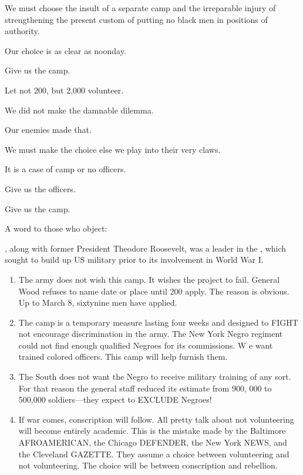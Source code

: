 \documentclass[letterpaper,10pt,english]{jupyterBook}
\begin{document}
\sphinxAtStartPar
We must choose the insult of a separate camp and the irreparable injury of strengthening the present custom of putting no black men in positions of authority.

\sphinxAtStartPar
Our choice is as clear as noonday.

\sphinxAtStartPar
Give us the camp.

\sphinxAtStartPar
Let not 200, but 2,000 volunteer.

\sphinxAtStartPar
We did not make the damnable dilemma.

\sphinxAtStartPar
Our enemies made that.

\sphinxAtStartPar
We must make the choice else we play into their very claws.

\sphinxAtStartPar
It is a case of camp or no officers.

\sphinxAtStartPar
Give us the officers.

\sphinxAtStartPar
Give us the camp.

\sphinxAtStartPar
A word to those who object:

\begin{sphinxShadowBox}
\sphinxstylesidebartitle{}

\sphinxAtStartPar
{}, along with  former President Theodore Roosevelt, was a leader in the , which sought to build up US military prior to its involvement in World War I.
\end{sphinxShadowBox}
\begin{enumerate}
%
\item {} 
\sphinxAtStartPar
The army does not wish this camp. It wishes the project to fail. General Wood refuses to name date or place until 200 apply. The reason is obvious. Up to March 8, sixty\sphinxhyphen{}nine men have applied.

\item {} 
\sphinxAtStartPar
The camp is a temporary measure lasting four weeks and designed to FIGHT not encourage discrimina­tion in the army. The New York Negro regiment could not find enough qualified Negroes for its commissions. W e want trained colored officers. This camp will help furnish them.

\item {} 
\sphinxAtStartPar
The South does not want the Negro to receive military training of any sort. For that reason the general staff reduced its estimate from 900,\sphinxhyphen{} 000 to 500,000 soldiers—they expect to EXCLUDE Negroes!

\item {} 
\sphinxAtStartPar
If war comes, conscription will follow. All pretty talk about not vol­unteering will become entirely aca­demic. This is the mistake made by the Baltimore AFRO\sphinxhyphen{}AMERICAN, the Chicago DEFENDER, the New York NEWS, and the Cleveland GAZETTE. They assume a choice between volunteering and not volunteer­ing. The choice will be between con­scription and rebellion.

\end{enumerate}
\end{document}
